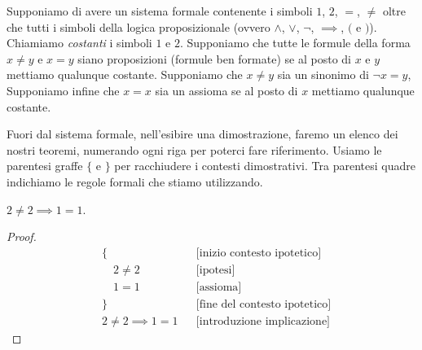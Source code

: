 Supponiamo di avere un sistema formale 
contenente i simboli $1$, $2$, $=$, $\neq$ oltre che
tutti i simboli della logica proposizionale 
(ovvero $\land$, $\lor$, $\lnot$, $\implies$, $($ e $)$).
Chiamiamo \emph{costanti} i simboli $1$ e $2$.
Supponiamo che tutte le formule della forma 
$x\neq y$ e $x=y$ siano proposizioni 
(formule ben formate) se al posto di $x$ e $y$ 
mettiamo qualunque costante. 
Supponiamo che $x\neq y$ sia un sinonimo di $\lnot x=y$,
Supponiamo infine che $x=x$ sia un assioma se al posto 
di $x$ mettiamo qualunque costante.

Fuori dal sistema formale, nell'esibire una dimostrazione,
faremo un elenco dei nostri teoremi, numerando ogni riga 
per poterci fare riferimento. 
Usiamo le parentesi graffe $\{$ e $\}$ per racchiudere 
i contesti dimostrativi. 
Tra parentesi quadre indichiamo le regole formali che stiamo 
utilizzando. 
\begin{theorem}
  $2 \neq 2 \implies 1=1$.
\end{theorem}
%  
\begin{proof}
  \begin{align}
    &\{ & &\text{[inizio contesto ipotetico]} \\ 
    &\quad 2\neq 2 & & \text{[ipotesi]}  \\
    &\quad 1=1 & & \text{[assioma]} \\
    &\} & & \text{[fine del contesto ipotetico]} \\
    &2\neq 2 \implies 1=1 & & \text{[introduzione implicazione]}
  \end{align}
\end{proof}


